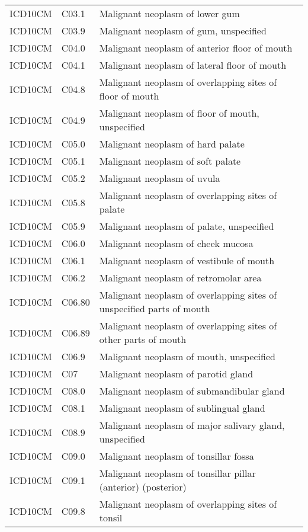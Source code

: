\begin{longtable}{p{}p{}p{}}
  ICD10CM & C03.1 & Malignant neoplasm of lower gum \\ 
  ICD10CM & C03.9 & Malignant neoplasm of gum, unspecified \\ 
  ICD10CM & C04.0 & Malignant neoplasm of anterior floor of mouth \\ 
  ICD10CM & C04.1 & Malignant neoplasm of lateral floor of mouth \\ 
  ICD10CM & C04.8 & Malignant neoplasm of overlapping sites of floor of mouth \\ 
  ICD10CM & C04.9 & Malignant neoplasm of floor of mouth, unspecified \\ 
  ICD10CM & C05.0 & Malignant neoplasm of hard palate \\ 
  ICD10CM & C05.1 & Malignant neoplasm of soft palate \\ 
  ICD10CM & C05.2 & Malignant neoplasm of uvula \\ 
  ICD10CM & C05.8 & Malignant neoplasm of overlapping sites of palate \\ 
  ICD10CM & C05.9 & Malignant neoplasm of palate, unspecified \\ 
  ICD10CM & C06.0 & Malignant neoplasm of cheek mucosa \\ 
  ICD10CM & C06.1 & Malignant neoplasm of vestibule of mouth \\ 
  ICD10CM & C06.2 & Malignant neoplasm of retromolar area \\ 
  ICD10CM & C06.80 & Malignant neoplasm of overlapping sites of unspecified parts of mouth \\ 
  ICD10CM & C06.89 & Malignant neoplasm of overlapping sites of other parts of mouth \\ 
  ICD10CM & C06.9 & Malignant neoplasm of mouth, unspecified \\ 
  ICD10CM & C07 & Malignant neoplasm of parotid gland \\ 
  ICD10CM & C08.0 & Malignant neoplasm of submandibular gland \\ 
  ICD10CM & C08.1 & Malignant neoplasm of sublingual gland \\ 
  ICD10CM & C08.9 & Malignant neoplasm of major salivary gland, unspecified \\ 
  ICD10CM & C09.0 & Malignant neoplasm of tonsillar fossa \\ 
  ICD10CM & C09.1 & Malignant neoplasm of tonsillar pillar (anterior) (posterior) \\ 
  ICD10CM & C09.8 & Malignant neoplasm of overlapping sites of tonsil \\ 

\end{longtable}
